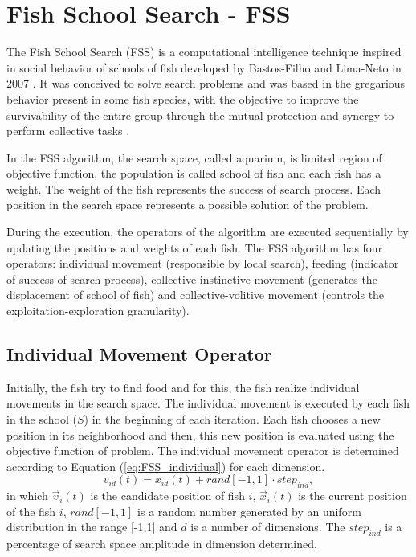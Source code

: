 \section{Fish School Search - FSS}\label{sec:FSS}
The Fish School Search (FSS) is a computational intelligence technique inspired in social behavior of schools of fish developed by Bastos-Filho and Lima-Neto in 2007 \cite{FSS:Bastos-Filho2008} \cite{FSS:BastosFilho2009}. It was conceived to solve search problems and was based in the gregarious behavior present in some fish species, with the objective to improve the survivability of the entire group through the mutual protection and synergy to perform collective tasks \cite{FSS:Lins2012}.

In the FSS algorithm, the search space, called aquarium, is limited region of objective function, the population is called school of fish and each fish has a weight. The weight of the fish represents the success of search process. Each position in the search space represents a possible solution of the problem.

During the execution, the operators of the algorithm are executed sequentially by updating the positions and weights of each fish. The FSS algorithm has four operators: individual movement (responsible by local search), feeding (indicator of success of search process), collective-instinctive movement (generates the displacement of school of fish) and collective-volitive movement (controls the exploitation-exploration granularity).

\subsection{Individual Movement Operator}
Initially, the fish try to find food and for this, the fish realize individual movements in the search space. The individual movement is executed by each fish in the school ($S$) in the beginning of each iteration.  Each fish chooses a new position in its neighborhood and then, this new position is evaluated using the objective function of problem. The individual movement operator is determined according to Equation (\ref{eq:FSS_individual}) for each dimension.
\begin{equation}\label{eq:FSS_individual}
v_{id}(t) = x_{id}(t) + rand[-1,1] \cdot step_{ind},
\end{equation}
in which $\vec v_i(t)$ is the candidate position of fish $i$, $\vec x_i(t)$ is the current position of the fish $i$, $rand[-1,1]$ is a random number generated by an uniform distribution in the range [-1,1] and $d$ is a number of dimensions. The $step_{ind}$ is a percentage of search space amplitude in dimension determined.

